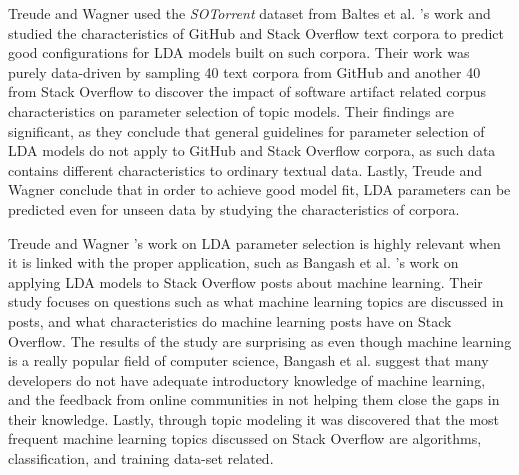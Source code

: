         
        Treude and Wagner \cite{treude2019predicting} used the \emph{SOTorrent} dataset from Baltes et al. \cite{baltes2019sotorrent}'s work and studied the characteristics of GitHub and Stack Overflow text corpora to predict good configurations for LDA models built on such corpora. Their work was purely data-driven by sampling 40 text corpora from GitHub and another 40 from Stack Overflow to discover the impact of software artifact related corpus characteristics on parameter selection of topic models. Their findings are significant, as they conclude that general guidelines for parameter selection of LDA models do not apply to GitHub and Stack Overflow corpora, as such data contains different characteristics to ordinary textual data. Lastly, Treude and Wagner conclude that in order to achieve good model fit, LDA parameters can be predicted even for unseen data by studying the characteristics of corpora.
        
         Treude and Wagner \cite{treude2019predicting}'s work on LDA parameter selection is highly relevant when it is linked with the proper application, such as Bangash et al. \cite{bangash2019developers}'s work on applying LDA models to Stack Overflow posts about machine learning. Their study focuses on questions such as what machine learning topics are discussed in posts, and what characteristics do machine learning posts have on Stack Overflow. The results of the study are surprising as even though machine learning is a really popular field of computer science, Bangash et al. suggest that many developers do not have adequate introductory knowledge of machine learning, and the feedback from online communities in not helping them close the gaps in their knowledge. Lastly, through topic modeling it was discovered that the most frequent machine learning topics discussed on Stack Overflow are algorithms, classification, and training data-set related.
         
